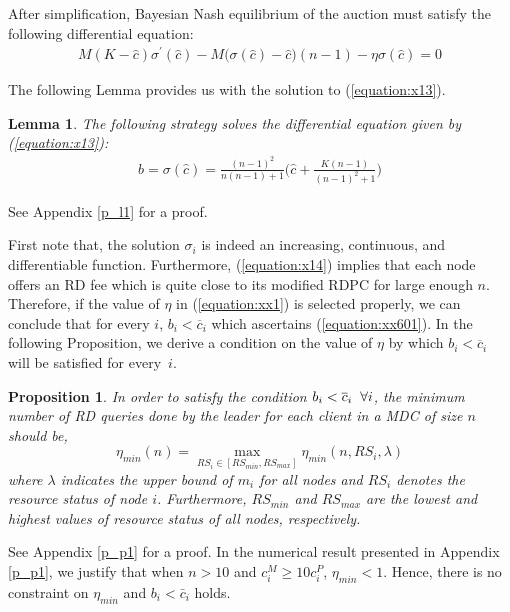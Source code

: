 \documentclass[journal,12pt, onecolumn]{IEEEtran}
\newtheorem{pr}{Proposition}
\newtheorem{lemma}{Lemma}
\begin{document}
After simplification, Bayesian Nash equilibrium of the auction must satisfy the following differential equation:
\begin{align}
\label{equation:x13}
M(K-\widehat{c})\sigma^{'}(\widehat{c}) - M \Big(\sigma(\widehat{c}) -\widehat{c}\Big)(n-1) -\eta\sigma(\widehat{c}) =0
\end{align}

The following Lemma provides us with the solution to (\ref{equation:x13}).
\begin{lemma}\label{lemma:diff}
The following strategy solves the differential equation given by (\ref{equation:x13}):
\vspace{-2mm}
\begin{align}
\label{equation:x14}
b = \sigma (\widehat{c})= \frac{(n-1)^2}{n(n-1)+1}\big(\widehat{c} + \frac{K(n-1)}{(n-1)^2+1}\big)
\end{align} 
 
\end{lemma}
See Appendix \ref{p_l1} for a proof.

First note that, the solution $\sigma_i$ is indeed an increasing, continuous, and differentiable function. Furthermore, (\ref{equation:x14}) implies that each node offers an RD fee which is quite close to its modified RDPC for large enough $n$. Therefore, if the value of $\eta$ in (\ref{equation:xx1}) is selected properly, we can conclude that for every $i$, $b_i < \overline{c}_i$ which ascertains (\ref{equation:xx601}). In the following Proposition, we derive a condition on the value of $\eta$ by which $b_i < \overline{c}_i$ will be satisfied for every~$i$.

\begin{pr}\label{peoposition:etha}
In order to satisfy the condition $b_i < \overline{c}_i \hspace{2mm} \forall i$, the minimum number of RD queries done by the leader for each client in a MDC of size $n$ should be,
$$
\eta_{min}(n)=\max_{RS_i\in [RS_{min}, RS_{max}]}\eta_{min}(n,RS_i,\lambda) 
$$
where $\lambda$ indicates the upper bound of $m_i$ for all nodes and $RS_i$ denotes the resource status of node $i$. Furthermore, $RS_{min}$ and $RS_{max}$ are the lowest and highest values of resource status of all nodes, respectively.
\end{pr}
See Appendix \ref{p_p1} for a proof.
In the numerical result presented in Appendix \ref{p_p1}, we justify that when $n > 10$ and $c_i^M \geq 10 c_i^P$, $\eta_{min} < 1$.
Hence, there is no constraint on $\eta_{min}$ and $b_i < \bar{c}_i$ holds. 
\end{document}
